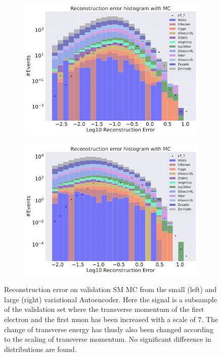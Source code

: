 \begin{figure}[H]
    \centering
    \begin{subfigure}{.45\textwidth}
        \includegraphics[width=\textwidth]{Figures/VAE_testing/small/b_data_recon_big_rm3_feats_sig_pT_7.pdf}
        \caption{}
        \label{fig:VAE_small_pt_7}
    \end{subfigure}
    \hfill 
    \begin{subfigure}{.45\textwidth}
        \includegraphics[width=\textwidth]{Figures/VAE_testing/big/b_data_recon_big_rm3_feats_sig_pT_7.pdf}
        \caption{ }
        \label{fig:VAE_big_pt_7}
    \end{subfigure}
    \hfill 
    \caption[VAE | Reconstruction error $p_T$ altering of 7]{Reconstruction error on validation SM MC from the small (left) and large (right) variational Autoencoder. Here the signal is a subsample of the validation 
    set where the transverse momentum of the first electron and the first muon has been increased with a scale of $7$. The change of transverse 
    energy has thusly also been changed according to the scaling of transverse momentum. No significant difference in distributions are found.  }
    \label{fig:VAE_big_small_pt_7}
\end{figure}

